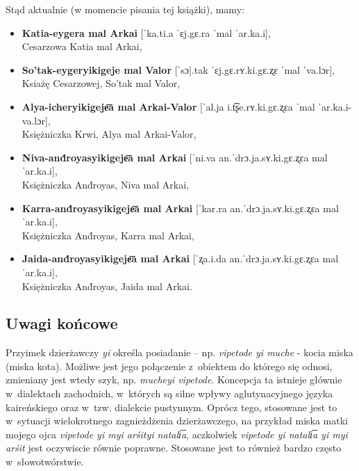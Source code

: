 \begin{spacing}{1.1}
Stąd aktualnie (w momencie pisania tej książki), mamy:

\begin{itemize}
\item \textbf{Katia-eygera mal Arkai} [ˈka.ti.a ˈɛj.gɛ.ra ˈmal ˈar.ka.i],\\ 
Cesarzowa Katia mal Arkai,
\item \textbf{So'tak-eygeryikigeje mal Valor} [ˈsɔ|.tak ˈɛj.gɛ.rʏ.ki.gɛ.ʐɛ 
ˈmal ˈva.lɔr],\\ Ksiażę Cesarzowej, So'tak mal Valor,
\item \textbf{Alya-icheryikigeje͞a mal Arkai-Valor} [ˈal.ja i.t͡ʂe.rʏ.ki.gɛ.ʐɛa ˈmal 
ˈar.ka.i-va.lɔr],\\ Księżniczka Krwi, Alya mal Arkai-Valor,
\item \textbf{Niva-and́royasyikigeje͞a mal Arkai} [ˈni.va an.ˈdrɔ.ja.sʏ.ki.gɛ.ʐɛa 
mal ˈar.ka.i],\\ Księżniczka And́royas, Niva mal Arkai,
\item \textbf{Karra-and́royasyikigeje͞a mal Arkai} [ˈkar.ra an.ˈdrɔ.ja.sʏ.ki.gɛ.ʐɛa 
mal ˈar.ka.i],\\ Księżniczka And́royas, Karra mal Arkai,
\item \textbf{Jaida-and́royasyikigeje͞a mal Arkai} [ˈʐa.i.da an.ˈdrɔ.ja.sʏ.ki.gɛ.ʐɛa
mal ˈar.ka.i],\\ Księżniczka And́royas, Jaida mal Arkai.
\end{itemize}


\subsection{Uwagi końcowe}

Przyimek dzierżawczy \emph{yi} określa posiadanie -- np. \emph{vipetode yi muche}
- kocia miska (miska kota). Możliwe jest jego połączenie z~obiektem do którego 
się odnosi, zmieniany jest wtedy szyk, np. \emph{mucheyi vipetode}. Koncepcja ta 
istnieje głównie w~dialektach zachodnich, w~których są silne wpływy 
aglutynacyjnego języka kaireńskiego oraz w~tzw. dialekcie pustynnym. Oprócz 
tego, stosowane jest to w~sytuacji wielokrotnego zagnieżdżenia dzierżawczego, 
na przykład miska matki mojego ojca \emph{vipetode yi myi arśityi natali͞a}, 
aczkolwiek \emph{vipetode yi natali͞a yi myi arśit} jest oczywiscie równie 
poprawne. Stosowane jest to również bardzo często w~słowotwórstwie.

\end{spacing}